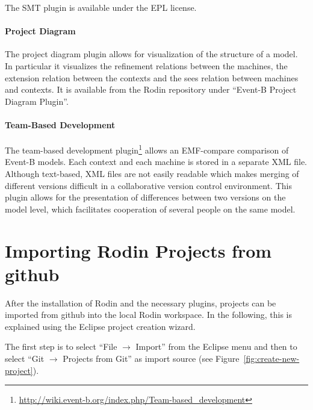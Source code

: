 \documentclass{template/openetcs_article}
\begin{document}
The SMT plugin is available under the EPL license.

\paragraph{Project Diagram}
\label{sec:project-diagram}

The project diagram plugin allows for visualization of the structure of a
model. In particular it visualizes the refinement relations between the
machines, the extension relation between the contexts and the sees relation
between machines and contexts. It is available from the Rodin repository under
``Event-B Project Diagram Plugin''.

\paragraph{Team-Based Development}
\label{sec:team-based-devel}

The team-based development
plugin\footnote{\url{http://wiki.event-b.org/index.php/Team-based_development}}
allows an EMF-compare comparison of Event-B models. Each context and each
machine is stored in a separate XML file. Although text-based, XML files are not
easily readable which makes merging of different versions difficult in a
collaborative version control environment. This plugin allows for the
presentation of differences between two versions on the model level, which
facilitates cooperation of several people on the same model.

\section{Importing Rodin Projects from github}
\label{sec:import-rodin-proj}

After the installation of Rodin and the necessary plugins, projects can be
imported from github into the local Rodin workspace. In the following, this is
explained using the Eclipse project creation wizard.

The first step is to select ``File $\rightarrow$ Import'' from the Eclipse menu
and then to select ``Git $\rightarrow$ Projects from Git'' as import source (see
Figure~\ref{fig:create-new-project}).
\end{document}
